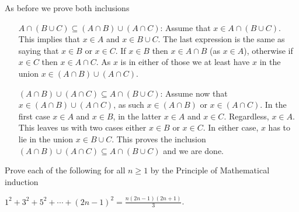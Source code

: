 \documentclass[a4paper, english, 12pt]{article} %
\newcommand{\solutions}{false} %
\begin{document}
\begin{answer}
  As before we prove both inclusions
  \begin{enumerate}[align=left]
    \item[$A \cap (B \cup C) \subseteq (A \cap B) \cup (A \cap C)$:] Assume that
      $x \in A \cap (B \cup C)$. This implies that $x \in A$ and $x \in B \cup
      C$. The last expression is the same as saying that $x \in B$ or $x \in C$.
      If $x \in B$ then $x \in A \cap B$ (as $x \in A$), otherwise if $x \in C$ then $x \in A
      \cap C$. As $x$ is in either of those we at least have $x$ in the union $x
      \in (A \cap B) \cup (A \cap C)$.
    \item[$(A \cap B) \cup (A \cap C) \subseteq A \cap (B \cup C)$:]
      Assume now that $x \in (A \cap B) \cup (A \cap C)$, as such $x \in (A \cap
      B)$ or $x \in (A \cap C)$. In the first case $x \in A$ and $x \in B$, in
      the latter $x \in A$ and $x \in C$. Regardless, $x \in A$. This leaves us
      with two cases either $x \in B$ or $x \in C$. In either case, $x$ has to
      lie in the union $x \in B \cup C$. This proves the inclusion
      $(A \cap B) \cup (A \cap C) \subseteq A \cap (B \cup C)$ and we are
      done.  
  \end{enumerate} 
\end{answer}


\ifthenelse{\boolean{\solutions}}{\newpage}{}


\begin{problem}
  Prove each of the following for all $n \geq 1$ by the Principle of
  Mathematical induction
\end{problem}

\begin{subproblem}
  $\displaystyle 1^2 + 3^2 + 5^2 + \cdots + (2n-1)^2 = \frac{n(2n-1)(2n+1)}{3}$.
\end{subproblem}
\end{document}
